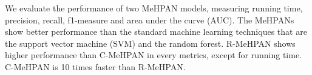 \documentclass{article}
\begin{document}
We evaluate the performance of two MeHPAN models, measuring running time, precision, recall, f1-measure and area under the curve (AUC). The MeHPANs show better performance than the standard machine learning techniques that are the support vector machine (SVM) and the random forest. R-MeHPAN shows higher performance than C-MeHPAN in every metrics, except for running time. C-MeHPAN is 10 times faster than R-MeHPAN. %




\end{document}
